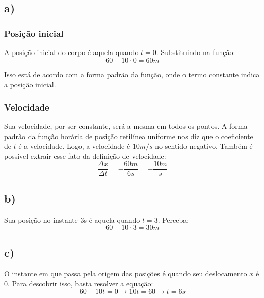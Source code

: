 \documentclass[a4paper]{article}
\begin{document}

\subsection{a)}
\subsubsection{Posição inicial}
\hspace{\parindent}A posição inicial do corpo é aquela quando \(t=0\). Substituindo na função:
\[60-10\cdot 0 = 60m\]
\par Isso está de acordo com a forma padrão da função, onde o termo constante indica a posição inicial.
\subsubsection{Velocidade}
\par Sua velocidade, por ser constante, será a mesma em todos os pontos. A forma padrão da função horária de posição retilínea uniforme nos diz que o coeficiente de \(t\) é a velocidade. Logo, a velocidade é \(10m/s\) no sentido negativo. Também é possível extrair esse fato da definição de velocidade:
\[\frac{\Delta x}{\Delta t}=-\frac{60m}{6s}=-\frac{10m}{s}\]

\subsection{b)}
\hspace{\parindent}Sua posição no instante 3s é aquela quando \(t=3\). Perceba:
\[60-10\cdot3=30m\]

\subsection{c)}
\hspace{\parindent}O instante em que passa pela origem das posições é quando seu deslocamento \(x\) é \(0\). Para descobrir isso, basta resolver a equação:
\[60-10t=0\rightarrow10t=60\rightarrow t=6s\]
\end{document}

